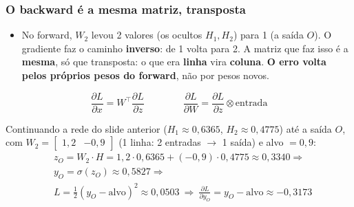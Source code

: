 \begin{frame}[shrink]
	\frametitle{O backward é a mesma matriz, transposta}
	\small
	\setlength{\abovedisplayskip}{2pt}
	\setlength{\belowdisplayskip}{2pt}
	\begin{itemize}
		\setlength{\itemsep}{0pt}
		\item No forward, $W_2$ levou 2 valores (os ocultos $H_1,H_2$) para 1 (a saída $O$). O gradiente faz o caminho \textbf{inverso}: de 1 volta para 2. A matriz que faz isso é a \textbf{mesma}, só que transposta: o que era \textbf{linha} vira \textbf{coluna}. \textbf{O erro volta pelos próprios pesos do forward}, não por pesos novos.
	\end{itemize}
	\begin{equation*}
		\frac{\partial L}{\partial x} = W^{\top} \frac{\partial L}{\partial z}
		\qquad\qquad
		\frac{\partial L}{\partial W} = \frac{\partial L}{\partial z} \otimes \text{entrada}
	\end{equation*}
	\par Continuando a rede do slide anterior ($H_1 \approx 0{,}6365$, $H_2 \approx 0{,}4775$) até a saída $O$, com $W_2 = \begin{bmatrix}1{,}2 & -0{,}9\end{bmatrix}$ (1 linha: 2 entradas $\to$ 1 saída) e alvo $=0{,}9$:
	\begin{equation*}
		\begin{aligned}
			& z_O = W_2 \cdot H = 1{,}2 \!\cdot\! 0{,}6365 + (-0{,}9) \!\cdot\! 0{,}4775 \approx 0{,}3340 \Rightarrow \\
			& y_O = \sigma(z_O) \approx 0{,}5827 \Rightarrow \\
			& L = \tfrac12(y_O - \text{alvo})^2 \approx 0{,}0503
			\ \Rightarrow\
			\frac{\partial L}{\partial y_O} = y_O - \text{alvo} \approx -0{,}3173
		\end{aligned}
	\end{equation*}
\end{frame}

